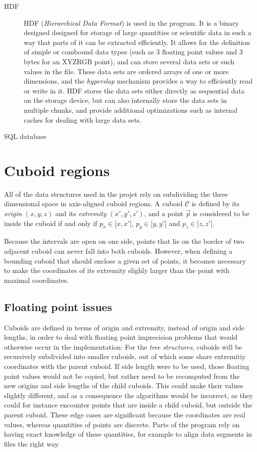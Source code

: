\documentclass[a4paper,10pt,abstracton,notitlepage]{scrreprt}
\begin{document}
\begin{description}
\item[HDF] HDF (\emph{Hierarchical Data Format}) is used in the program. It is a binary designed designed for storage of large quantities or scientific data in such a way that parts of it can be extracted efficiently. It allows for the definition of simple or combound data types (such as 3 floating point values and 3 bytes for an XYZRGB point), and can store several data sets or such values in the file. These data sets are ordered arrays of one or more dimensions, and the \emph{hyperslap} mechanism provides a way to efficiently read or write in it. HDF stores the data sets either directly as sequential data on the storage device, but can also internally store the data sets in multiple chunks, and provide additional optimizations such as internal caches for dealing with large data sets.
\item[SQL database] 
\end{description}

\section{Cuboid regions}
All of the data structures used in the projet rely on subdividing the three dimensional space in axis-aligned cuboid regions. A cuboid $\mathcal{C}$ is defined by its \emph{origin} $(x, y, z)$ and its \emph{extremity} $(x', y', z')$, and a point $\overrightarrow{p}$ is considered to be inside the cuboid if and only if $p_{x} \in [x, x'[$, $p_{y} \in [y, y'[$ and $p_{z} \in [z, z'[$.

Because the intervals are open on one side, points that lie on the border of two adjacent cuboid can never fall into both cuboids. However, when defining a bounding cuboid that should enclose a given set of points, it becomes necessary to make the coordinates of its extremity slighly larger than the point with maximal coordinates.

\subsection{Floating point issues}
Cuboids are defined in terms of origin and extremity, instead of origin and side lengths, in order to deal with floating point imprecision problems that would otherwise occur in the implementation: For the \emph{tree structures}, cuboids will be recursively subdivided into smaller cuboids, out of which some share extremitiy coordinates with the parent cuboid. If side length were to be used, those floating point values would not be copied, but rather need to be recomputed from the new origins and side lengths of the child cuboids. This could make their values slightly different, and as a consequence the algorithms would be incorrect, as they could for instance encounter points that are inside a child cuboid, but outside the parent cuboid.
These edge cases are significant because the coordinates are real values, whereas quantities of points are discrete. Parts of the program rely on having exact knowledge of these quantities, for example to align data segments in files the right way.
\end{document}
